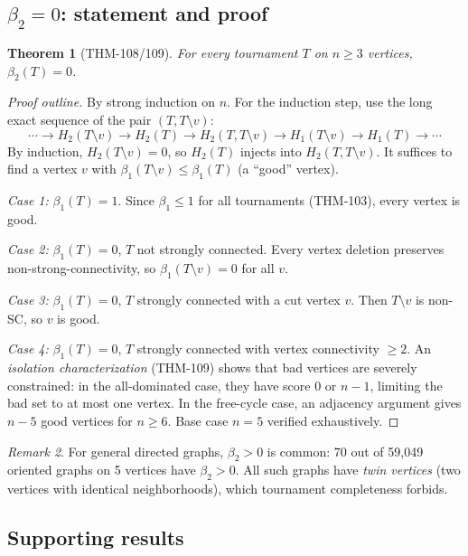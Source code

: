 \documentclass[12pt,reqno]{amsart}
\theoremstyle{plain}
\newtheorem{theorem}{Theorem}[section]
\theoremstyle{definition}
\theoremstyle{remark}
\newtheorem{remark}[theorem]{Remark}
\begin{document}
\subsection{$\beta_2 = 0$: statement and proof}

\begin{theorem}[THM-108/109]\label{thm:beta2}
For every tournament $T$ on $n \geq 3$ vertices, $\beta_2(T) = 0$.
\end{theorem}

\begin{proof}[Proof outline]
By strong induction on $n$. For the induction step, use the long exact
sequence of the pair $(T, T \setminus v)$:
\[
\cdots \to H_2(T \setminus v) \to H_2(T) \to H_2(T, T \setminus v) \to H_1(T \setminus v) \to H_1(T) \to \cdots
\]
By induction, $H_2(T \setminus v) = 0$, so $H_2(T)$ injects into
$H_2(T, T \setminus v)$. It suffices to find a vertex $v$ with
$\beta_1(T \setminus v) \leq \beta_1(T)$ (a ``good'' vertex).

\emph{Case 1:} $\beta_1(T) = 1$. Since $\beta_1 \leq 1$ for all tournaments
(THM-103), every vertex is good.

\emph{Case 2:} $\beta_1(T) = 0$, $T$ not strongly connected. Every vertex
deletion preserves non-strong-connectivity, so $\beta_1(T \setminus v) = 0$
for all $v$.

\emph{Case 3:} $\beta_1(T) = 0$, $T$ strongly connected with a cut vertex $v$.
Then $T \setminus v$ is non-SC, so $v$ is good.

\emph{Case 4:} $\beta_1(T) = 0$, $T$ strongly connected with vertex
connectivity $\geq 2$. An \emph{isolation characterization} (THM-109) shows
that bad vertices are severely constrained: in the all-dominated case, they
have score $0$ or $n-1$, limiting the bad set to at most one vertex. In the
free-cycle case, an adjacency argument gives $n - 5$ good vertices for $n \geq 6$.
Base case $n = 5$ verified exhaustively.
\end{proof}

\begin{remark}
For general directed graphs, $\beta_2 > 0$ is common: 70 out of 59{,}049
oriented graphs on 5 vertices have $\beta_2 > 0$. All such graphs have
\emph{twin vertices} (two vertices with identical neighborhoods), which
tournament completeness forbids.
\end{remark}

\subsection{Supporting results}
\end{document}
